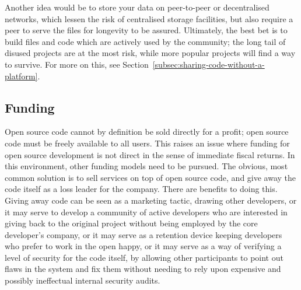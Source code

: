 Another idea would be to store your data on peer-to-peer or decentralised networks, which lessen the risk of centralised storage facilities, but also require a peer to serve the files for longevity to be assured. Ultimately, the best bet is to build files and code which are actively used by the community; the long tail of disused projects are at the most risk, while more popular projects will find a way to survive. For more on this, see Section~\ref{subsec:sharing-code-without-a-platform}.







\subsection{Funding}
\label{subsec:oss-funding}

Open source code cannot by definition be sold directly for a profit; open source code must be freely available to all users. This raises an issue where funding for open source development is not direct in the sense of immediate fiscal returns. In this environment, other funding models need to be pursued. The obvious, most common solution is to sell services on top of open source code, and give away the code itself as a loss leader for the company. There are benefits to doing this. Giving away code can be seen as a marketing tactic, drawing other developers, or it may serve to develop a community of active developers who are interested in giving back to the original project without being employed by the core developer's company, or it may serve as a retention device keeping developers who prefer to work in the open happy, or it may serve as a way of verifying a level of security for the code itself, by allowing other participants to point out flaws in the system and fix them without needing to rely upon expensive and possibly ineffectual internal security audits.

